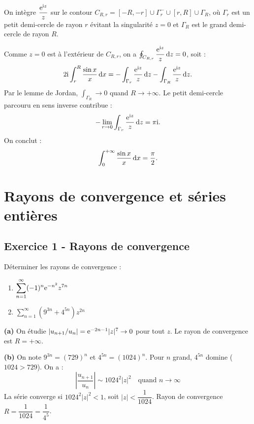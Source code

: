 \documentclass[12pt,a4paper]{article}
\begin{document}
\begin{boitecorrige}
On intègre $\dfrac{\mathrm{e}^{\mathrm{i} z}}{z}$ sur le contour $C_{R,r} = [-R,-r]\cup\Gamma_r^{-}\cup[r,R]\cup\Gamma_R$, où $\Gamma_r$ est un petit demi-cercle de rayon $r$ évitant la singularité $z=0$ et $\Gamma_R$ est le grand demi-cercle de rayon $R$.

Comme $z=0$ est à l'extérieur de $C_{R,r}$, on a $\oint_{C_{R,r}}\dfrac{\mathrm{e}^{\mathrm{i} z}}{z}\,\mathrm{d} z = 0$, soit :
\[
2\mathrm{i}\int_r^R\frac{\sin x}{x}\,\mathrm{d} x = -\int_{\Gamma_r}\frac{\mathrm{e}^{\mathrm{i} z}}{z}\,\mathrm{d} z - \int_{\Gamma_R}\frac{\mathrm{e}^{\mathrm{i} z}}{z}\,\mathrm{d} z.
\]
Par le lemme de Jordan, $\int_{\Gamma_R}\to 0$ quand $R\to+\infty$. Le petit demi-cercle parcouru en sens inverse contribue :
\[
-\lim_{r\to 0}\int_{\Gamma_r}\frac{\mathrm{e}^{\mathrm{i} z}}{z}\,\mathrm{d} z = \pi\mathrm{i}.
\]
On conclut :
\[
\int_0^{+\infty}\frac{\sin x}{x}\,\mathrm{d} x = \frac{\pi}{2}.
\]
\end{boitecorrige}


\section{Rayons de convergence et séries entières}

\subsection*{Exercice 1 - Rayons de convergence \niveau{\moyen}}

\begin{boiteexercice}
Déterminer les rayons de convergence :
\begin{enumerate}[label=(\alph*)]
  \item $\displaystyle\sum_{n=1}^{\infty} (-1)^n \mathrm{e}^{-n^2} z^{7n}$
  \item $\displaystyle\sum_{n=1}^{\infty} (9^{3n} + 4^{5n})z^{2n}$
\end{enumerate}
\end{boiteexercice}

\begin{boitecorrige}
\textbf{(a)} On étudie $|u_{n+1}/u_n| = \mathrm{e}^{-2n-1}|z|^7 \to 0$ pour tout $z$. Le rayon de convergence est $R = +\infty$.

\textbf{(b)} On note $9^{3n} = (729)^n$ et $4^{5n} = (1024)^n$. Pour $n$ grand, $4^{5n}$ domine ($1024 > 729$). On a :
\[
\left|\frac{u_{n+1}}{u_n}\right| \sim 1024^2 |z|^2 \quad\text{quand }n\to\infty
\]
La série converge si $1024^2|z|^2 < 1$, soit $|z| < \dfrac{1}{1024}$. Rayon de convergence $R = \dfrac{1}{1024} = \dfrac{1}{4^5}$.
\end{boitecorrige}
\end{document}
